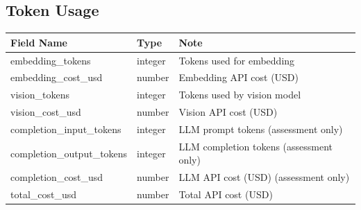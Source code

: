 \documentclass[11pt]{article}
\begin{document}
\subsection{Token Usage}
\label{sec:tokenusage}

\begin{longtable}{|p{4.5cm}|p{2cm}|p{8.2cm}|}
  \hline
  \rowcolor{tabheader}
  \textbf{Field Name} & \textbf{Type} & \textbf{Note} \\
  \hline
  \endhead
  embedding\_tokens         & integer & Tokens used for embedding \\
  \hline
  embedding\_cost\_usd      & number  & Embedding API cost (USD) \\
  \hline
  vision\_tokens            & integer & Tokens used by vision model \\
  \hline
  vision\_cost\_usd         & number  & Vision API cost (USD) \\
  \hline
  completion\_input\_tokens  & integer & LLM prompt tokens (assessment only) \\
  \hline
  completion\_output\_tokens & integer & LLM completion tokens (assessment only) \\
  \hline
  completion\_cost\_usd     & number  & LLM API cost (USD) (assessment only) \\
  \hline
  total\_cost\_usd          & number  & Total API cost (USD) \\
  \hline
\end{longtable}
\end{document}

